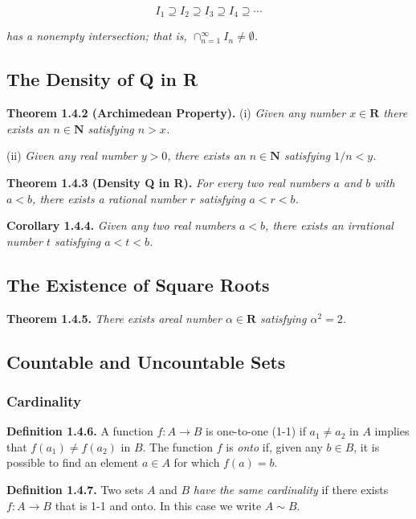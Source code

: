 \documentclass[12pt]{report}
\newcommand{\R}{\textbf{R}}
\newcommand{\N}{\textbf{N}}
\begin{document}
\[I_1\supseteq I_2\supseteq I_3\supseteq I_4\supseteq \cdots\]

\noindent \textit{has a nonempty intersection; that is, $\cap_{n=1}^\infty I_n\neq\emptyset$.}
\bigskip

\subsection*{The Density of Q in R}

\noindent \textbf{Theorem 1.4.2 (Archimedean Property).} (i) \textit{Given any number $x\in\R$ there exists an $n\in\N$ satisfying $n>x$.}

(ii) \textit{Given any real number $y>0$, there exists an $n\in\N$ satisfying $1/n<y$.}
\bigskip

\noindent \textbf{Theorem 1.4.3 (Density Q in R).} \textit{For every two real numbers $a$ and $b$ with $a<b$, there exists a rational number $r$ satisfying $a<r<b$.}
\bigskip

\noindent \textbf{Corollary 1.4.4.} \textit{Given any two real numbers $a<b$, there exists an irrational number $t$ satisfying $a<t<b$.}
\bigskip

\subsection*{The Existence of Square Roots}

\noindent \textbf{Theorem 1.4.5.} \textit{There exists areal number $\alpha\in\R$ satisfying $\alpha^2=2$.}
\bigskip

\subsection*{Countable and Uncountable Sets}

\subsubsection*{Cardinality}

\noindent \textbf{Definition 1.4.6.} A function $f:A\rightarrow B$ is one-to-one (1-1) if $a_1\neq a_2$ in $A$ implies that $f(a_1)\neq f(a_2)$ in $B$.  The function $f$ is \textit{onto} if, given any $b\in B$, it is possible to find an element $a\in A$ for which $f(a)=b$.
\bigskip

\noindent \textbf{Definition 1.4.7.} Two sets $A$ and $B$ \textit{have the same cardinality} if there exists $f:A\rightarrow B$ that is 1-1 and onto.  In this case we write $A\sim B$.
\bigskip
\end{document}
